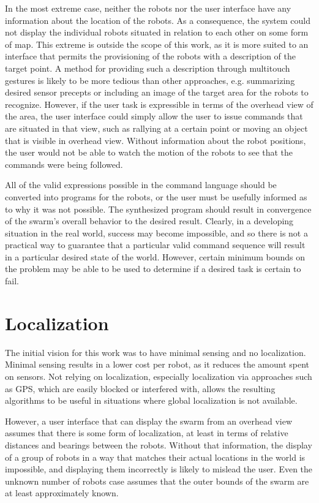 In the most extreme case, neither the robots nor the user interface have any information about the location of the robots. 
As a consequence, the system could not display the individual robots situated in relation to each other on some form of map. 
This extreme is outside the scope of this work, as it is more suited to an interface that permits the provisioning of the robots with a description of the target point. 
A method for providing such a description through multitouch gestures is likely to be more tedious than other approaches, e.g. summarizing desired sensor precepts or including an image of the target area for the robots to recognize. 
However, if the user task is expressible in terms of the overhead view of the area, the user interface could simply allow the user to issue commands that are situated in that view, such as rallying at a certain point or moving an object that is visible in overhead view. 
Without information about the robot positions, the user would not be able to watch the motion of the robots to see that the commands were being followed. 

All of the valid expressions possible in the command language should be converted into programs for the robots, or the user must be usefully informed as to why it was not possible. 
The synthesized program should result in convergence of the swarm's overall behavior to the desired result. 
Clearly, in a developing situation in the real world, success may become impossible, and so there is not a practical way to guarantee that a particular valid command sequence will result in a particular desired state of the world. 
However, certain minimum bounds on the problem may be able to be used to determine if a desired task is certain to fail. 

\section{Localization}\label{sec:localization}

The initial vision for this work was to have minimal sensing and no localization. 
Minimal sensing results in a lower cost per robot, as it reduces the amount spent on sensors. 
Not relying on localization, especially localization via approaches such as GPS, which are easily blocked or interfered with, allows the resulting algorithms to be useful in situations where global localization is not available. 

However, a user interface that can display the swarm from an overhead view assumes that there is some form of localization, at least in terms of relative distances and bearings between the robots.
Without that information, the display of a group of robots in a way that matches their actual locations in the world is impossible, and displaying them incorrectly is likely to mislead the user. 
Even the unknown number of robots case assumes that the outer bounds of the swarm are at least approximately known. 

